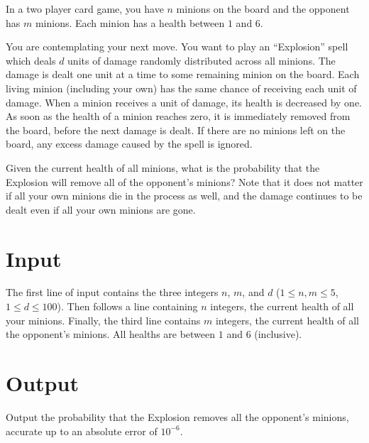 
%
\noindent
In a two player card game, you have $n$ minions on the board and the
opponent has $m$ minions. Each minion has a health between $1$ and
$6$.

You are contemplating your next move. You want to play an
``Explosion'' spell which deals $d$ units of damage randomly distributed across all
minions. The damage is dealt one unit at a time to some remaining minion on the board.
Each living minion (including your own) has the same chance of receiving each unit of damage.
When a minion receives a unit of damage, its health is decreased by one.
As soon as the health of a minion reaches zero, it is immediately removed from the board, before the next damage
is dealt. If there are no minions left on the board, any excess damage caused by the spell is ignored.

Given the current health of all minions, what is the probability that the Explosion will remove all of the opponent's minions?
Note that it does not matter if all your own minions die in the process as well, and the damage continues to be dealt even if all your own minions are gone.

\section*{Input}

The first line of input contains the three integers $n$, $m$, and $d$ ($1 \le n, m \le 5$, $1 \le d \le 100$).
Then follows a line containing $n$ integers, the current health of all your minions.
Finally, the third line contains $m$ integers, the current health of all the opponent's minions.  All healths are between $1$ and $6$ (inclusive).

\section*{Output}

Output the probability that the Explosion removes all the opponent's minions,
accurate up to an absolute error of $10^{-6}$.
